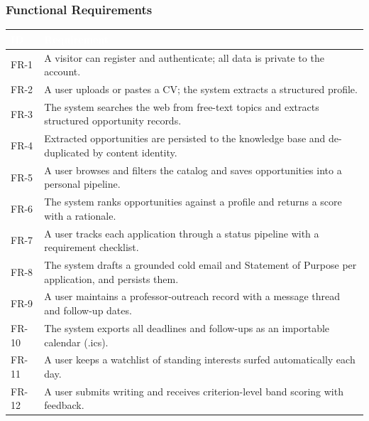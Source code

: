 \documentclass[11pt,a4paper]{article}
\begin{document}
\subsubsection{Functional Requirements}
\renewcommand{\arraystretch}{1.25}
\begin{tabularx}{\linewidth}{|C{1.35cm}|X|}
\hline
{}\textcolor{white}{\textbf{ID}} & \textcolor{white}{\textbf{Requirement}} \\
\hline
\mbox{FR-1} & A visitor can register and authenticate; all data is private to the account. \\
\mbox{FR-2} & A user uploads or pastes a CV; the system extracts a structured profile. \\
\mbox{FR-3} & The system searches the web from free-text topics and extracts structured opportunity records. \\
\mbox{FR-4} & Extracted opportunities are persisted to the knowledge base and de-duplicated by content identity. \\
\mbox{FR-5} & A user browses and filters the catalog and saves opportunities into a personal pipeline. \\
\mbox{FR-6} & The system ranks opportunities against a profile and returns a score with a rationale. \\
\mbox{FR-7} & A user tracks each application through a status pipeline with a requirement checklist. \\
\mbox{FR-8} & The system drafts a grounded cold email and Statement of Purpose per application, and persists them. \\
\mbox{FR-9} & A user maintains a professor-outreach record with a message thread and follow-up dates. \\
\mbox{FR-10} & The system exports all deadlines and follow-ups as an importable calendar (.ics). \\
\mbox{FR-11} & A user keeps a watchlist of standing interests surfed automatically each day. \\
\mbox{FR-12} & A user submits writing and receives criterion-level band scoring with feedback. \\
\hline
\end{tabularx}
\end{document}
